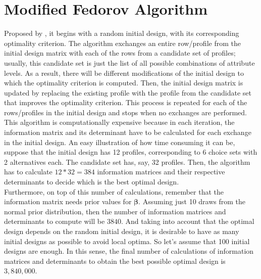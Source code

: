 \documentclass[12pt,a4paper,oneside]{article}
\begin{document}
\section{Modified Fedorov Algorithm}
Proposed by \citet{Cook1980}, it begins with a random initial design, with its corresponding optimality criterion. The algorithm exchanges an entire row/profile from the initial design matrix with each of the rows from a candidate set of profiles; usually, this candidate set is just the list of all possible combinations of attribute levels. As a result, there will be different modifications of the initial design to which the optimality criterion is computed. Then, the initial design matrix is updated by replacing the existing profile with the profile from the candidate set that improves the optimality criterion. This process is repeated for each of the rows/profiles in the initial design and stops when no exchanges are performed.\\


\noindent This algorithm is computationally expensive because in each iteration, the information matrix and its determinant have to be calculated for each exchange in the initial design. An easy illustration of how time consuming it can be, suppose that the initial design has 12 profiles, corresponding to 6 choice sets with 2 alternatives each. The candidate set has, say, 32 profiles. Then, the algorithm has to calculate $12*32=384$ information matrices and their respective determinants to decide which is the best optimal design. \\

\noindent Furthermore, on top of this number of calculations, remember that the information matrix needs prior values for $\pmb{\beta}$. Assuming just 10 draws from the normal prior distribution, then the number of information matrices and determinants to compute will be $3840$. And taking into account that the optimal design depends on the random initial design, it is desirable to have as many initial designs as possible to avoid local optima. So let's assume that 100 initial designs are enough. In this sense, the final number of calculations of information matrices and determinants to obtain the best possible optimal design is $3,840,000$.\\
\end{document}
